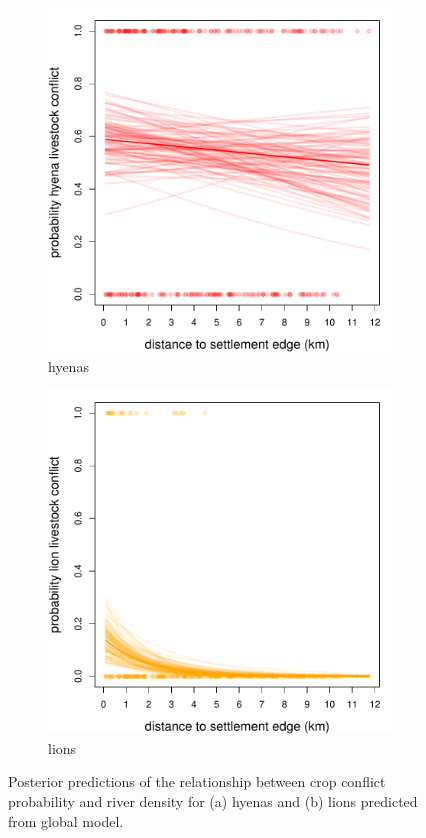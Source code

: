 \documentclass[12pt,]{article}
\begin{document}
\begin{figure}
  \centering
	\begin{subfigure}[b]{0.49\textwidth}
	\includegraphics[width=\textwidth]{Figures/settle_dist_livestock_global_conflict_hyena.pdf} 
    \caption{hyenas}
   	    \label{fig:cropSDhyena}
\end{subfigure}
\begin{subfigure}[b]{0.49\textwidth}
	\includegraphics[width=\textwidth]{Figures/settle_dist_livestock_global_conflict_lion.pdf}  
    \caption{lions}
  	\label{fig:cropSDleo}
\end{subfigure}
\caption{Posterior predictions of the relationship between crop conflict probability and river density for (a) hyenas and (b) lions predicted from global model.}
\end{figure}
\end{document}
